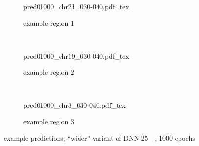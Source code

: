 \begin{figure}[p]
    \begin{subfigure}{\textwidth}
        \centering
        \scriptsize
        {pred01000_chr21_030-040.pdf_tex}
        \caption{example  region 1} \label{fig:results:wider_r1}
    \end{subfigure}\\[6mm]
    \begin{subfigure}{\textwidth}
        \centering
        \scriptsize
        {pred01000_chr19_030-040.pdf_tex}
        \caption{example region 2} \label{fig:results:wider_r2}
    \end{subfigure}\\[6mm]
    \begin{subfigure}{\textwidth}
        \centering
        \scriptsize
        {pred01000_chr3_030-040.pdf_tex}
        \caption{example region 3} \label{fig:results:wider_r3}
    \end{subfigure}
    \caption{example predictions, ``wider'' variant of DNN \SI{25}{\kilo\bp}, 1000 epochs}\label{fig:results:wider_matrices}
\end{figure}

